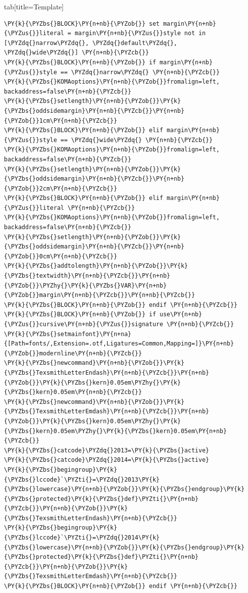 \documentclass[a4paper,twoside]{article}
\begin{document}
\begin{tsdiv}{tab}[title=Template]
\begin{tscode}[lang=latex, engine=pygments]
\begin{Verbatim}[commandchars=\\\{\},breaklines, breakanywhere, commandchars=\\\{\}]
\PY{k}{\PYZbs{}BLOCK}\PY{n+nb}{\PYZob{}} set margin\PY{n+nb}{\PYZus{}}literal = margin\PY{n+nb}{\PYZus{}}style not in [\PYZdq{}narrow\PYZdq{}, \PYZdq{}default\PYZdq{}, \PYZdq{}wide\PYZdq{}] \PY{n+nb}{\PYZcb{}}
\PY{k}{\PYZbs{}BLOCK}\PY{n+nb}{\PYZob{}} if margin\PY{n+nb}{\PYZus{}}style == \PYZdq{}narrow\PYZdq{} \PY{n+nb}{\PYZcb{}}
\PY{k}{\PYZbs{}KOMAoptions}\PY{n+nb}{\PYZob{}}fromalign=left, backaddress=false\PY{n+nb}{\PYZcb{}}
\PY{k}{\PYZbs{}setlength}\PY{n+nb}{\PYZob{}}\PY{k}{\PYZbs{}oddsidemargin}\PY{n+nb}{\PYZcb{}}\PY{n+nb}{\PYZob{}}1cm\PY{n+nb}{\PYZcb{}}
\PY{k}{\PYZbs{}BLOCK}\PY{n+nb}{\PYZob{}} elif margin\PY{n+nb}{\PYZus{}}style == \PYZdq{}wide\PYZdq{} \PY{n+nb}{\PYZcb{}}
\PY{k}{\PYZbs{}KOMAoptions}\PY{n+nb}{\PYZob{}}fromalign=left, backaddress=false\PY{n+nb}{\PYZcb{}}
\PY{k}{\PYZbs{}setlength}\PY{n+nb}{\PYZob{}}\PY{k}{\PYZbs{}oddsidemargin}\PY{n+nb}{\PYZcb{}}\PY{n+nb}{\PYZob{}}2cm\PY{n+nb}{\PYZcb{}}
\PY{k}{\PYZbs{}BLOCK}\PY{n+nb}{\PYZob{}} elif margin\PY{n+nb}{\PYZus{}}literal \PY{n+nb}{\PYZcb{}}
\PY{k}{\PYZbs{}KOMAoptions}\PY{n+nb}{\PYZob{}}fromalign=left, backaddress=false\PY{n+nb}{\PYZcb{}}
\PY{k}{\PYZbs{}setlength}\PY{n+nb}{\PYZob{}}\PY{k}{\PYZbs{}oddsidemargin}\PY{n+nb}{\PYZcb{}}\PY{n+nb}{\PYZob{}}0cm\PY{n+nb}{\PYZcb{}}
\PY{k}{\PYZbs{}addtolength}\PY{n+nb}{\PYZob{}}\PY{k}{\PYZbs{}textwidth}\PY{n+nb}{\PYZcb{}}\PY{n+nb}{\PYZob{}}\PYZhy{}\PY{k}{\PYZbs{}VAR}\PY{n+nb}{\PYZob{}}margin\PY{n+nb}{\PYZcb{}}\PY{n+nb}{\PYZcb{}}
\PY{k}{\PYZbs{}BLOCK}\PY{n+nb}{\PYZob{}} endif \PY{n+nb}{\PYZcb{}}
\PY{k}{\PYZbs{}BLOCK}\PY{n+nb}{\PYZob{}} if use\PY{n+nb}{\PYZus{}}cursive\PY{n+nb}{\PYZus{}}signature \PY{n+nb}{\PYZcb{}}
\PY{k}{\PYZbs{}setmainfont}\PY{n+na}{[Path=fonts/,Extension=.otf,Ligatures=Common,Mapping=]}\PY{n+nb}{\PYZob{}}modernline\PY{n+nb}{\PYZcb{}}
\PY{k}{\PYZbs{}newcommand}\PY{n+nb}{\PYZob{}}\PY{k}{\PYZbs{}TexsmithLetterEndash}\PY{n+nb}{\PYZcb{}}\PY{n+nb}{\PYZob{}}\PY{k}{\PYZbs{}kern}0.05em\PYZhy{}\PY{k}{\PYZbs{}kern}0.05em\PY{n+nb}{\PYZcb{}}
\PY{k}{\PYZbs{}newcommand}\PY{n+nb}{\PYZob{}}\PY{k}{\PYZbs{}TexsmithLetterEmdash}\PY{n+nb}{\PYZcb{}}\PY{n+nb}{\PYZob{}}\PY{k}{\PYZbs{}kern}0.05em\PYZhy{}\PY{k}{\PYZbs{}kern}0.05em\PYZhy{}\PY{k}{\PYZbs{}kern}0.05em\PY{n+nb}{\PYZcb{}}
\PY{k}{\PYZbs{}catcode}\PYZdq{}2013=\PY{k}{\PYZbs{}active}
\PY{k}{\PYZbs{}catcode}\PYZdq{}2014=\PY{k}{\PYZbs{}active}
\PY{k}{\PYZbs{}begingroup}\PY{k}{\PYZbs{}lccode}`\PYZti{}=\PYZdq{}2013\PY{k}{\PYZbs{}lowercase}\PY{n+nb}{\PYZob{}}\PY{k}{\PYZbs{}endgroup}\PY{k}{\PYZbs{}protected}\PY{k}{\PYZbs{}def}\PYZti{}\PY{n+nb}{\PYZcb{}}\PY{n+nb}{\PYZob{}}\PY{k}{\PYZbs{}TexsmithLetterEndash}\PY{n+nb}{\PYZcb{}}
\PY{k}{\PYZbs{}begingroup}\PY{k}{\PYZbs{}lccode}`\PYZti{}=\PYZdq{}2014\PY{k}{\PYZbs{}lowercase}\PY{n+nb}{\PYZob{}}\PY{k}{\PYZbs{}endgroup}\PY{k}{\PYZbs{}protected}\PY{k}{\PYZbs{}def}\PYZti{}\PY{n+nb}{\PYZcb{}}\PY{n+nb}{\PYZob{}}\PY{k}{\PYZbs{}TexsmithLetterEmdash}\PY{n+nb}{\PYZcb{}}
\PY{k}{\PYZbs{}BLOCK}\PY{n+nb}{\PYZob{}} endif \PY{n+nb}{\PYZcb{}}


\end{Verbatim}
\end{tscode}
\end{tsdiv}
\end{document}
